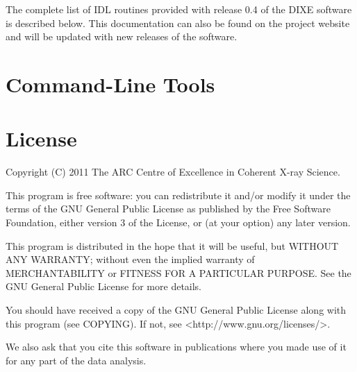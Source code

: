 \documentclass[]{cxs-software}
\begin{document}
The complete list of IDL routines provided with release 0.4 of the
DIXE software is described below. This documentation can also be found
on the project website and will be updated with new releases of the
software.




\section{Command-Line Tools}




\section{License}

Copyright (C) 2011 The ARC Centre of Excellence in Coherent X-ray
Science.

This program is free software: you can redistribute it and/or modify
it under the terms of the GNU General Public License as published
by the Free Software Foundation, either version 3 of the License,
or (at your option) any later version.

This program is distributed in the hope that it will be useful,
but WITHOUT ANY WARRANTY; without even the implied warranty of
MERCHANTABILITY or FITNESS FOR A PARTICULAR PURPOSE.  See the
GNU General Public License for more details.

You should have received a copy of the GNU General Public License
along with this program (see COPYING).  If not, see
<http://www.gnu.org/licenses/>.

We also ask that you cite this software in publications where you made
use of it for any part of the data analysis.
\end{document}
